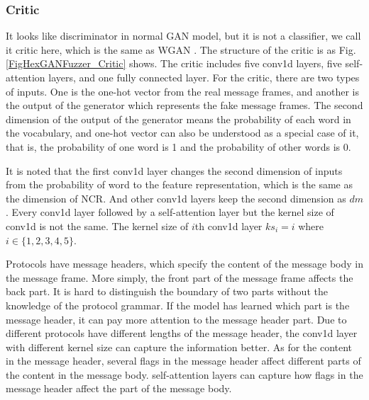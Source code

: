 \subsubsection{\textbf{Critic}}
It looks like discriminator in normal GAN model, but it is not a classifier, we call it critic here, which is the same as WGAN \cite{arjovsky2017wasserstein}. The structure of the critic is as Fig. \ref{FigHexGANFuzzer_Critic} shows. The critic includes five conv1d layers, five self-attention layers, and one fully connected layer. For the critic, there are two types of inputs. One is the one-hot vector from the real message frames, and another is the output of the generator which represents the fake message frames. 
The second dimension of the output of the generator means the probability of each word in the vocabulary, and one-hot vector can also be understood as a special case of it, that is, the probability of one word is 1 and the probability of other words is 0. 

It is noted that the first conv1d layer changes the second dimension of inputs from the probability of word to the feature representation, which is the same as the dimension of NCR. And other conv1d layers keep the second dimension as $dm$. Every conv1d layer followed by a self-attention layer but the kernel size of conv1d is not the same. The kernel size of $i$th conv1d layer $ks_i = i$ where $i \in \{1,2,3,4,5\}$. 

Protocols have message headers, which specify the content of the message body in the message frame. More simply, the front part of the message frame affects the back part. It is hard to distinguish the boundary of two parts without the knowledge of the protocol grammar. If the model has learned which part is the message header, it can pay more attention to the message header part.
Due to different protocols have different lengths of the message header, the conv1d layer with different kernel size can capture the information better.
As for the content in the message header, several flags in the message header affect different parts of the content in the message body. self-attention layers can capture how flags in the message header affect the part of the message body.

